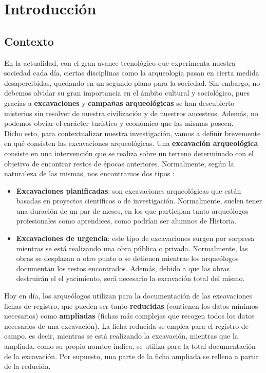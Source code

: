 \chapter{Introducción}
\section{Contexto}
En la actualidad, con el gran avance tecnológico que experimenta nuestra sociedad cada día,
ciertas disciplinas como la arqueología pasan en cierta medida desapercibidas, quedando en
un segundo plano para la sociedad. Sin embargo, no debemos olvidar su gran importancia en
el ámbito cultural y sociológico, pues gracias a \textbf{excavaciones} y \textbf{campañas
arqueológicas} se han descubierto misterios sin resolver de nuestra civilización y de
nuestros ancestros. Además, no podemos obviar el carácter turístico y económico que las
mismas poseen. \\

Dicho esto, para contextualizar nuestra investigación, vamos a definir brevemente en qué
consisten las excavaciones arqueológicas. Una \textbf{excavación arqueológica} consiste en
una intervención que se realiza sobre un terreno determinado con el objetivo de encontrar
restos de épocas anteriores. Normalmente, según la naturaleza de las mismas, nos encontramos
dos tipos \cite{excavation-type}:

    \begin{itemize}
        \item \textbf{Excavaciones planificadas}: son excavaciones arqueológicas que
        están basadas en proyectos científicos o de investigación. Normalmente, suelen
        tener una duración de un par de meses, en los que participan tanto arqueólogos
        profesionales como aprendices, como podrían ser alumnos de Historia.

        \item \textbf{Excavaciones de urgencia}: este tipo de excavaciones surgen por
        sorpresa mientras se está realizando una obra pública o privada. Normalmente,
        las obras se desplazan a otro punto o se detienen mientras los arqueólogos
        documentan los restos encontrados. Además, debido a que las obras destruirán el
        el yacimiento, será necesario la excavación total del mismo.\\
    \end{itemize}

Hoy en día, los arqueólogos utilizan para la documentación de las excavaciones fichas de
registro, que pueden ser tanto \textbf{reducidas} (contienen los datos mínimos necesarios)
como \textbf{ampliadas} (fichas más complejas que recogen todos los datos necesarios de una
excavación). La ficha reducida se emplea para el registro de campo, es decir, mientras se
está realizando la excavación, mientras que la ampliada, como su propio nombre indica, se
utiliza para la total documentación de la excavación. Por supuesto, una parte de la ficha
ampliada se rellena a partir de la reducida. \\ 

